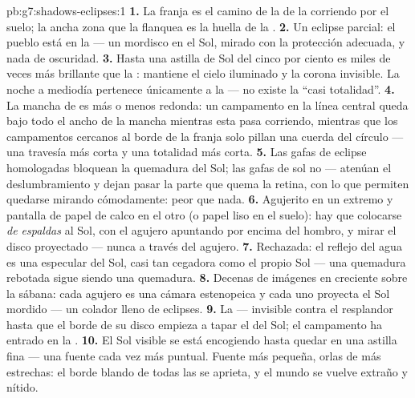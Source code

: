 \begin{solution}{pb:g7:shadows-eclipses:1}
\textbf{1.} La franja es el camino de la  de la 
corriendo por el suelo; la ancha zona que la flanquea es la huella de
la .
\textbf{2.} Un eclipse parcial: el pueblo está en la
 --- un mordisco en el Sol, mirado con la protección
adecuada, y nada de oscuridad.
\textbf{3.} Hasta una astilla de Sol del cinco por ciento es miles de
veces más brillante que la : mantiene el cielo iluminado y
la corona invisible. La noche a mediodía pertenece únicamente a la
 --- no existe la ``casi totalidad''.
\textbf{4.} La mancha de  es más o menos redonda: un campamento
en la línea central queda bajo todo el ancho de la mancha mientras
esta pasa corriendo, mientras que los campamentos cercanos al borde de
la franja solo pillan una cuerda del círculo --- una travesía más
corta y una totalidad más corta.
\textbf{5.} Las gafas de eclipse homologadas bloquean la quemadura del
Sol; las gafas de sol no --- atenúan el deslumbramiento y dejan pasar
la parte que quema la retina, con lo que permiten quedarse mirando
cómodamente: peor que nada.
\textbf{6.} Agujerito en un extremo y pantalla de papel de calco en el
otro (o papel liso en el suelo): hay que colocarse \emph{de espaldas}
al Sol, con el agujero apuntando por encima del hombro, y mirar el
disco proyectado --- nunca a través del agujero.
\textbf{7.} Rechazada: el reflejo del agua es una
 especular del Sol, casi tan cegadora como el propio Sol ---
una quemadura rebotada sigue siendo una quemadura.
\textbf{8.} Decenas de imágenes en creciente sobre la sábana:
cada agujero es una cámara estenopeica y cada uno proyecta el Sol
mordido --- un colador lleno de eclipses.
\textbf{9.} La  --- invisible contra el resplandor hasta que el
borde de su disco empieza a tapar el del Sol; el campamento ha entrado
en la .
\textbf{10.} El Sol visible se está encogiendo hasta quedar en una
astilla fina --- una fuente cada vez más puntual. Fuente más pequeña,
orlas de  más estrechas: el borde blando de todas las
 se aprieta, y el mundo se vuelve extraño y nítido.

\end{solution}
